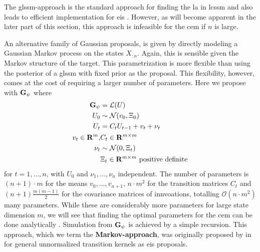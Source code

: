 The \gls{glssm}-approach is the standard approach for finding the \gls{la} in \gls{lcssm} \cite{Durbin1997Monte,Durbin2012Time,Jungbacker2007Monte} and also leads to efficient implementation for \gls{eis} \cite{Koopman2019Modified}. However, as will become apparent in the later part of this section, this approach is infeasible for the \gls{cem} if $n$ is large. 

An alternative family of Gaussian proposals, is given by directly modeling a Gaussian Markov process on the states $X_{:n}$. Again, this is sensible given the Markov structure of the target. This parametrization is more flexible than using the posterior of a \gls{glssm} with fixed prior as the proposal. This flexibility, however, comes at the cost of requiring a larger number of parameters. Here we propose with $\mathbf G_{\psi}$ where
\begin{align}
    \begin{split}
    \label{eq:markov-proposal}
    \mathbf G_{\psi} &= \mathcal L (U) \\
    U_{0} &\sim \mathcal N(v_{0}, \Xi_{0})\\
    U_{t} &= C_{t}U_{t - 1} + v_{t} + \nu_{t} \\
    v_{t} \in \mathbf R^{m}, &C_{t} \in \mathbf R^{m\times m}\\
    \nu_{t} &\sim \mathcal N(0,\Xi_{t}) \\
    &\Xi_{t}\in\mathbf R^{m \times m} \text{ positive definite}
    \end{split}
\end{align}
for $t = 1, \dots, n$, with $U_{0}$ and $\nu_{1}, \dots, \nu_{n}$ independent. The number of parameters is $(n + 1)\cdot m$ for the means $v_{0}, \dots, v_{n + 1}$, $n \cdot m^{2}$ for the transition matrices $C_{t}$ and $(n + 1) \frac{m (m - 1)}{2}$ for the covariance matrices of innvoations, totalling $\mathcal O(n\cdot m^{2})$ many parameters. 
While these are considerably more parameters for large state dimension $m$, we will see that finding the optimal parameters for the \gls{cem} can be done analytically . Simulation from $\mathbf G_{\psi}$ is achieved by a simple recursion. 
This approach, which we term the \textbf{Markov-approach}, was originally proposed by \citeauthor{Richard2007Efficient} in \cite{Richard2007Efficient} for general unnormalized transition kernels as \gls{eis} proposals.

